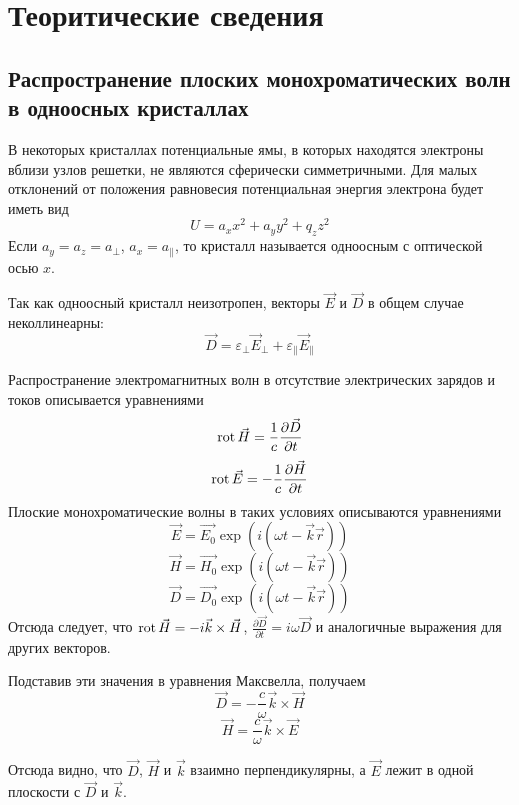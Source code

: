 \section{Теоритические сведения}
\subsection{Распространение плоских монохроматических волн в одноосных кристаллах}
В некоторых кристаллах потенциальные ямы, в которых находятся электроны вблизи узлов решетки, не являются сферически симметричными. Для малых отклонений от положения равновесия потенциальная энергия электрона будет иметь вид
\[
    U  = a_{x}x^{2} + a_{y}y^{2} + q_{z}z^{2}
\]
Если $a_{y} = a_{z} = a_{\perp}$, $a_{x} = a_{\parallel}$, то кристалл называется одноосным с оптической осью $x$.

Так как одноосный кристалл неизотропен, векторы $\vec{E}$ и $\vec{D}$ в общем случае неколлинеарны:
\[
\vec{D} = \varepsilon_{\perp}\vec{E}_{\perp} + \varepsilon_{\parallel}\vec{E}_{\parallel}
\]

Распространение электромагнитных волн в отсутствие электрических зарядов и токов описывается уравнениями
\[
    \operatorname{rot} \vec{H} = \frac{1}{c}\frac{\partial \vec{D}}{\partial t}
\]
\[
    \operatorname{rot} \vec{E} = -\frac{1}{c}\frac{\partial\vec{H}}{\partial t}
\]
Плоские монохроматические волны в таких условиях описываются уравнениями
\[
    \vec{E} = \vec{E_{0}}\exp{\left(i\left(\omega t - \vec{k}\vec{r}\right)\right)}
\]
\[
    \vec{H} = \vec{H_{0}}\exp{\left(i\left(\omega t - \vec{k}\vec{r}\right)\right)}
\]
\[
    \vec{D} = \vec{D_{0}}\exp{\left(i\left(\omega t - \vec{k}\vec{r}\right)\right)}
\]
Отсюда следует, что $\operatorname{rot}\vec{H} = -i\vec{k}\times\vec{H}$, $\frac{\partial \vec{D}}{\partial t} = i \omega \vec{D}$ и аналогичные выражения для других векторов.

Подставив эти значения в уравнения Максвелла, получаем
\[
    \vec{D} = -\frac{c}{ \omega} \vec{k} \times \vec{H}
\]
\[
    \vec{H} = \frac{c}{ \omega} \vec{k} \times \vec{E}
\]

Отсюда видно, что $\vec{D}$, $\vec{H}$ и $\vec{k}$ взаимно перпендикулярны, а $\vec{E}$ лежит в одной плоскости с $\vec{D}$ и $\vec{k}$.

\begin{figure}[ht!]
\end{figure}

